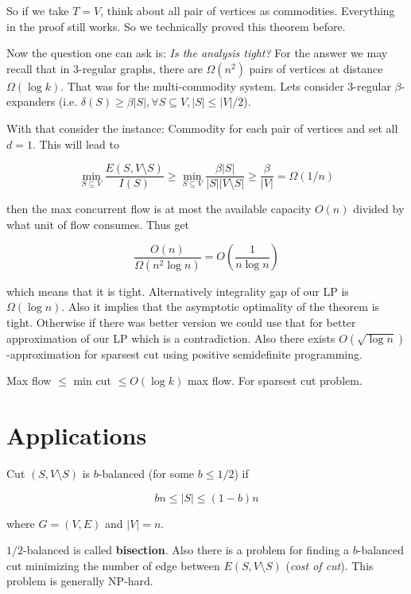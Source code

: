 So if we take $T = V$, think about all pair of vertices as commodities. Everything in the proof still works. So we technically proved this theorem before.

Now the question one can ask is: \textit{Is the analysis tight?} For the answer we may recall that in 3-regular graphs, there are $\Omega (n^{2})$ pairs of vertices at distance $\Omega (\log k)$. That was for the multi-commodity system. Lets consider 3-regular $\beta$-expanders (i.e. $\delta (S) \geq \beta|S|, \forall S \subseteq V, |S| \leq |V|/2$).

With that consider the instance: Commodity for each pair of vertices and set all $d = 1$. This will lead to

$$
\min_{S \subseteq V} \frac{E(S, V \setminus S)}{I(S)} \geq \min_{S \subseteq V} \frac{\beta |S|}{|S| |V \setminus S|} \geq \frac{\beta}{|V|} = \Omega(1/n)
$$

then the max concurrent flow is at most the available capacity $O(n)$ divided by what unit of flow consumes. Thus get

$$
\frac{O(n)}{\Omega (n^{2} \log n)} = O\left( \frac{1}{n \log n} \right)
$$

which means that it is tight. Alternatively integrality gap of our LP is $\Omega(\log n)$. Also it implies that the asymptotic optimality of the theorem is tight. Otherwise if there was better version we could use that for better approximation of our LP which is a contradiction. Also there exists $O(\sqrt{\log n})$-approximation for sparsest cut using positive semidefinite programming.

\begin{cor}
	Max flow $\leq$ min cut $\leq O(\log k)$ max flow. For sparsest cut problem.
\end{cor}

\section{Applications}

\begin{defn}
	Cut $(S, V \setminus S)$ is $b$-balanced (for some $b \leq 1/2$) if
	
	$$
	b n \leq |S| \leq (1-b)n
	$$
	
	where $G = (V,E)$ and $|V| = n$.
\end{defn}

$1/2$-balanced is called \textbf{bisection}. Also there is a problem for finding a $b$-balanced cut minimizing the number of edge between $E(S, V \setminus S)$ (\textit{cost of cut}). This problem is generally NP-hard.

